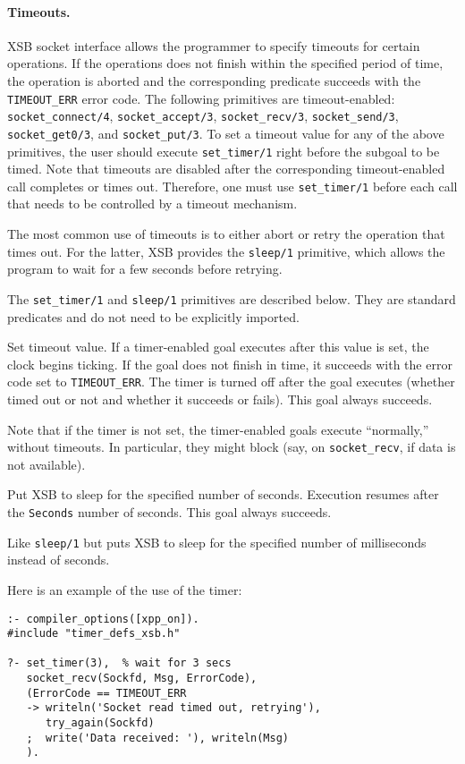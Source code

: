 \paragraph{Timeouts.}
XSB socket interface allows the programmer to specify timeouts for
certain operations. If the operations does not finish within the
specified period of time, the operation is aborted and the
corresponding predicate succeeds with the {\tt TIMEOUT\_ERR} error
code. The following primitives are timeout-enabled: {\tt
  socket\_connect/4}, {\tt socket\_accept/3}, {\tt socket\_recv/3},
{\tt socket\_send/3}, {\tt socket\_get0/3}, and {\tt socket\_put/3}.
To set a timeout value for any of the above primitives, the user
should execute {\tt set\_timer/1} right before the subgoal to be
timed. Note that timeouts are disabled after the corresponding
timeout-enabled call completes or times out. Therefore, one must use
{\tt set\_timer/1} before each call that needs to be controlled by a
timeout mechanism.

The most common use of timeouts is to either abort or retry the operation
that times out. For the latter, XSB provides the {\tt sleep/1} primitive,
which allows the program to wait for a few seconds before retrying.

The {\tt set\_timer/1} and {\tt sleep/1} primitives are described below.
They are standard predicates and do not need to be explicitly imported.
\begin{description}
Set timeout value. If a timer-enabled goal executes after this value is
set, the clock begins ticking. If the goal does not finish in time, it
succeeds with the error code set to {\tt TIMEOUT\_ERR}. The timer is turned
off after the goal executes (whether timed out or not and whether it
succeeds or fails). This goal always succeeds.

Note that if the timer is not set, the timer-enabled goals execute
``normally,'' without timeouts. In particular, they might block (say, on
{\tt socket\_recv}, if data is not available).

Put XSB to sleep for the specified number of seconds. Execution resumes
after the {\tt Seconds} number of seconds. This goal always succeeds.

Like \texttt{sleep/1} but puts 
XSB to sleep for the specified number of milliseconds instead of seconds.
\end{description}
Here is an example of the use of the timer:
\begin{samepage}
\begin{verbatim}
:- compiler_options([xpp_on]).
#include "timer_defs_xsb.h"

?- set_timer(3),  % wait for 3 secs
   socket_recv(Sockfd, Msg, ErrorCode),
   (ErrorCode == TIMEOUT_ERR
   -> writeln('Socket read timed out, retrying'),
      try_again(Sockfd)
   ;  write('Data received: '), writeln(Msg)
   ).
\end{verbatim}
\end{samepage}

